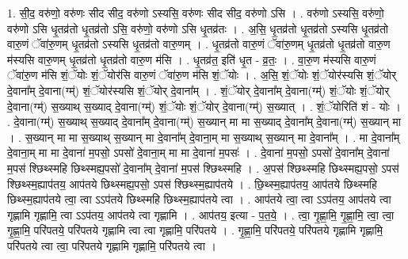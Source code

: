 \documentclass[17pt]{extarticle}
\begin{document}
1. सी॒द॒ वरु॑णो॒ वरु॑णः सीद सीद॒ वरु॑णो ऽस्यसि॒ वरु॑णः सीद सीद॒ वरु॑णो ऽसि । . वरु॑णो ऽस्यसि॒ वरु॑णो॒ वरु॑णो ऽसि धृ॒तव्र॑तो धृ॒तव्र॑तो ऽसि॒ वरु॑णो॒ वरु॑णो ऽसि धृ॒तव्र॑तः । . अ॒सि॒ धृ॒तव्र॑तो धृ॒तव्र॑तो ऽस्यसि धृ॒तव्र॑तो वारु॒णं ॅवा॑रु॒णम् धृ॒तव्र॑तो ऽस्यसि धृ॒तव्र॑तो वारु॒णम् । . धृ॒तव्र॑तो वारु॒णं ॅवा॑रु॒णम् धृ॒तव्र॑तो धृ॒तव्र॑तो वारु॒ण म॑स्यसि वारु॒णम् धृ॒तव्र॑तो धृ॒तव्र॑तो वारु॒ण म॑सि । . धृ॒तव्र॑त॒ इति॑ धृ॒त - व्र॒तः॒ । . वा॒रु॒ण म॑स्यसि वारु॒णं ॅवा॑रु॒ण म॑सि शं॒ॅयोः शं॒ॅयोर॑सि वारु॒णं ॅवा॑रु॒ण म॑सि शं॒ॅयोः । . अ॒सि॒ शं॒ॅयोः शं॒ॅयोर॑स्यसि शं॒ॅयोर् दे॒वाना᳚म् दे॒वाना(ग्म्॑) शं॒ॅयोर॑स्यसि शं॒ॅयोर् दे॒वाना᳚म् । . शं॒ॅयोर् दे॒वाना᳚म् दे॒वाना(ग्म्॑) शं॒ॅयोः शं॒ॅयोर् दे॒वाना(ग्म्॑) स॒ख्याथ् स॒ख्याद् दे॒वाना(ग्म्॑) शं॒ॅयोः शं॒ॅयोर् दे॒वाना(ग्म्॑) स॒ख्यात् । . शं॒ॅयोरिति॑ शं - योः । . दे॒वाना(ग्म्॑) स॒ख्याथ् स॒ख्याद् दे॒वाना᳚म् दे॒वाना(ग्म्॑) स॒ख्यान् मा मा स॒ख्याद् दे॒वाना᳚म् दे॒वाना(ग्म्॑) स॒ख्यान् मा । . स॒ख्यान् मा मा स॒ख्याथ् स॒ख्यान् मा दे॒वाना᳚म् दे॒वाना॒म् मा स॒ख्याथ् स॒ख्यान् मा दे॒वाना᳚म् । . मा दे॒वाना᳚म् दे॒वाना॒म् मा मा दे॒वाना॑ म॒पसो॒ ऽपसो॑ दे॒वाना॒म् मा मा दे॒वाना॑ म॒पसः॑ । . दे॒वाना॑ म॒पसो॒ ऽपसो॑ दे॒वाना᳚म् दे॒वाना॑ म॒पस॑ श्छिथ्स्महि छिथ्स्मह्य॒पसो॑ दे॒वाना᳚म् दे॒वाना॑ म॒पस॑ श्छिथ्स्महि । . अ॒पस॑ श्छिथ्स्महि छिथ्स्मह्य॒पसो॒ ऽपस॑ श्छिथ्स्म॒ह्याप॑तय॒ आप॑तये छिथ्स्मह्य॒पसो॒ ऽपस॑ श्छिथ्स्म॒ह्याप॑तये । . छि॒थ्स्म॒ह्याप॑तय॒ आप॑तये छिथ्स्महि छिथ्स्म॒ह्याप॑तये त्वा॒ त्वा ऽऽप॑तये छिथ्स्महि छिथ्स्म॒ह्याप॑तये त्वा । . आप॑तये त्वा॒ त्वा ऽऽप॑तय॒ आप॑तये त्वा गृह्णामि गृह्णामि॒ त्वा ऽऽप॑तय॒ आप॑तये त्वा गृह्णामि । . आप॑तय॒ इत्या - प॒त॒ये॒ । . त्वा॒ गृ॒ह्णा॒मि॒ गृ॒ह्णा॒मि॒ त्वा॒ त्वा॒ गृ॒ह्णा॒मि॒ परि॑पतये॒ परि॑पतये गृह्णामि त्वा त्वा गृह्णामि॒ परि॑पतये । . गृ॒ह्णा॒मि॒ परि॑पतये॒ परि॑पतये गृह्णामि गृह्णामि॒ परि॑पतये त्वा त्वा॒ परि॑पतये गृह्णामि गृह्णामि॒ परि॑पतये त्वा । \newline
\end{document}
